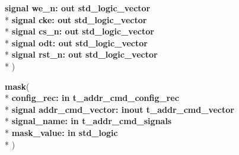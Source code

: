 \begin{DoxyCompactItemize}
  {\bfseries \textcolor{keywordflow}{signal }\textcolor{vhdlchar}{we\+\_\+n\+: }\textcolor{stringliteral}{} {\bfseries \textcolor{keywordflow}{out}\textcolor{vhdlchar}{ }\textcolor{comment}{std\+\_\+logic\+\_\+vector}\textcolor{vhdlchar}{ }}}\\*
  {\bfseries \textcolor{keywordflow}{signal }\textcolor{vhdlchar}{cke\+: }\textcolor{stringliteral}{} {\bfseries \textcolor{keywordflow}{out}\textcolor{vhdlchar}{ }\textcolor{comment}{std\+\_\+logic\+\_\+vector}\textcolor{vhdlchar}{ }}}\\*
  {\bfseries \textcolor{keywordflow}{signal }\textcolor{vhdlchar}{cs\+\_\+n\+: }\textcolor{stringliteral}{} {\bfseries \textcolor{keywordflow}{out}\textcolor{vhdlchar}{ }\textcolor{comment}{std\+\_\+logic\+\_\+vector}\textcolor{vhdlchar}{ }}}\\*
  {\bfseries \textcolor{keywordflow}{signal }\textcolor{vhdlchar}{odt\+: }\textcolor{stringliteral}{} {\bfseries \textcolor{keywordflow}{out}\textcolor{vhdlchar}{ }\textcolor{comment}{std\+\_\+logic\+\_\+vector}\textcolor{vhdlchar}{ }}}\\*
  {\bfseries \textcolor{keywordflow}{signal }\textcolor{vhdlchar}{rst\+\_\+n\+: }\textcolor{stringliteral}{} {\bfseries \textcolor{keywordflow}{out}\textcolor{vhdlchar}{ }\textcolor{comment}{std\+\_\+logic\+\_\+vector}\textcolor{vhdlchar}{ }}}\\*
   )
\item 
{\bfseries {\bfseries \textcolor{vhdlchar}{ }}} {\bf mask}( \\*
{\bfseries \textcolor{vhdlchar}{ }\textcolor{vhdlchar}{config\+\_\+rec\+: }\textcolor{stringliteral}{} {\bfseries \textcolor{keywordflow}{in}\textcolor{vhdlchar}{ }{\bfseries {\bf t\+\_\+addr\+\_\+cmd\+\_\+config\+\_\+rec}} \textcolor{vhdlchar}{ }}}\\*
  {\bfseries \textcolor{keywordflow}{signal }\textcolor{vhdlchar}{addr\+\_\+cmd\+\_\+vector\+: }\textcolor{stringliteral}{} {\bfseries \textcolor{keywordflow}{inout}\textcolor{vhdlchar}{ }{\bfseries {\bf t\+\_\+addr\+\_\+cmd\+\_\+vector}} \textcolor{vhdlchar}{ }}}\\*
  {\bfseries \textcolor{vhdlchar}{ }\textcolor{vhdlchar}{signal\+\_\+name\+: }\textcolor{stringliteral}{} {\bfseries \textcolor{keywordflow}{in}\textcolor{vhdlchar}{ }{\bfseries {\bf t\+\_\+addr\+\_\+cmd\+\_\+signals}} \textcolor{vhdlchar}{ }}}\\*
  {\bfseries \textcolor{vhdlchar}{ }\textcolor{vhdlchar}{mask\+\_\+value\+: }\textcolor{stringliteral}{} {\bfseries \textcolor{keywordflow}{in}\textcolor{vhdlchar}{ }\textcolor{comment}{std\+\_\+logic}\textcolor{vhdlchar}{ }}}\\*
   )
\end{DoxyCompactItemize}
